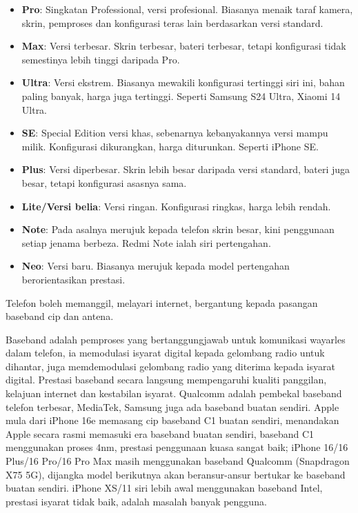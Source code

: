 
\begin{itemize}
  \item \textbf{Pro}: Singkatan Professional, versi profesional. Biasanya menaik taraf kamera, skrin, pemproses dan konfigurasi teras lain berdasarkan versi standard.
  \item \textbf{Max}: Versi terbesar. Skrin terbesar, bateri terbesar, tetapi konfigurasi tidak semestinya lebih tinggi daripada Pro.
  \item \textbf{Ultra}: Versi ekstrem. Biasanya mewakili konfigurasi tertinggi siri ini, bahan paling banyak, harga juga tertinggi. Seperti Samsung S24 Ultra, Xiaomi 14 Ultra.
  \item \textbf{SE}: Special Edition versi khas, sebenarnya kebanyakannya versi mampu milik. Konfigurasi dikurangkan, harga diturunkan. Seperti iPhone SE.
  \item \textbf{Plus}: Versi diperbesar. Skrin lebih besar daripada versi standard, bateri juga besar, tetapi konfigurasi asasnya sama.
  \item \textbf{Lite/Versi belia}: Versi ringan. Konfigurasi ringkas, harga lebih rendah.
  \item \textbf{Note}: Pada asalnya merujuk kepada telefon skrin besar, kini penggunaan setiap jenama berbeza. Redmi Note ialah siri pertengahan.
  \item \textbf{Neo}: Versi baru. Biasanya merujuk kepada model pertengahan berorientasikan prestasi.
\end{itemize}


Telefon boleh memanggil, melayari internet, bergantung kepada pasangan baseband cip dan antena.


Baseband adalah pemproses yang bertanggungjawab untuk komunikasi wayarles dalam telefon, ia memodulasi isyarat digital kepada gelombang radio untuk dihantar, juga memdemodulasi gelombang radio yang diterima kepada isyarat digital. Prestasi baseband secara langsung mempengaruhi kualiti panggilan, kelajuan internet dan kestabilan isyarat. Qualcomm adalah pembekal baseband telefon terbesar, MediaTek, Samsung juga ada baseband buatan sendiri. Apple mula dari iPhone 16e memasang cip baseband C1 buatan sendiri, menandakan Apple secara rasmi memasuki era baseband buatan sendiri, baseband C1 menggunakan proses 4nm, prestasi penggunaan kuasa sangat baik; iPhone 16/16 Plus/16 Pro/16 Pro Max masih menggunakan baseband Qualcomm (Snapdragon X75 5G), dijangka model berikutnya akan beransur-ansur bertukar ke baseband buatan sendiri. iPhone XS/11 siri lebih awal menggunakan baseband Intel, prestasi isyarat tidak baik, adalah masalah banyak pengguna.

